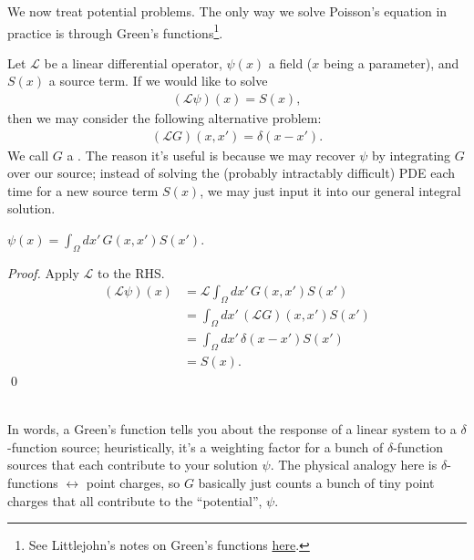 \documentclass[11pt]{article}
\begin{document}
We now treat potential problems. The only way we solve Poisson's equation in 
practice is through Green's functions\footnote{See Littlejohn's notes on Green's functions 
\href{https://bohr.physics.berkeley.edu/classes/209/f02/green.pdf}{here}.}.
\begin{iidea}
    Let $\mathcal{L}$ be a linear differential operator, $\psi(x)$ a field ($x$
    being a parameter), and $S(x)$ a source term. If we would like to solve
    \begin{align*}
        (\mathcal{L} \psi)(x) = S(x),
    \end{align*}
    then we may consider the following alternative problem:
    \begin{align}
        (\mathcal{L}G)(x, x') = \delta(x - x').
        \label{greensFunc}
    \end{align}
    We call $G$ a . The reason it's
    useful is because we may recover $\psi$ by integrating
    $G$ over our source; instead of solving the (probably
    intractably difficult) PDE each time for a new source term $S(x)$,
    we may just input it into our general integral solution.
    \begin{claim}
        $\psi(x) = \int_{\Omega} dx' \, G(x, x') S(x')$.
    \end{claim}
    \begin{proof}
        Apply $\mathcal{L}$ to the RHS.
        \begin{align*}
            (\mathcal{L} \psi)(x)
            & = \mathcal{L} \int_{\Omega} dx' \, G(x, x') S(x')\\
            & = \int_{\Omega} dx' \, (\mathcal{L} G)(x, x') S(x')\\
            & = \int_{\Omega} dx' \, \delta(x - x') S(x')\\
            & = S(x).
        \end{align*}
        \qed
    \end{proof}\\
    In words, a Green's function tells you about the response of a linear system
    to a $\delta$-function source; heuristically, it's a weighting factor for a bunch
    of $\delta$-function sources that each contribute to your solution $\psi$. The
    physical analogy here is $\delta$-functions $\leftrightarrow$ point charges,
    so $G$ basically just counts a bunch of tiny point charges that all contribute
    to the ``potential'', $\psi$.
\end{iidea}
\end{document}
